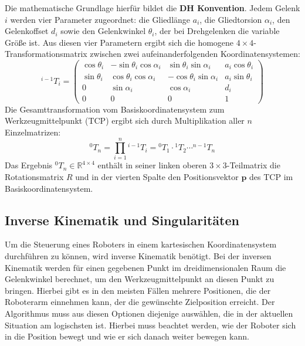         Die mathematische Grundlage hierfür bildet die \textbf{\ac{DH}\- Konvention}.
        Jedem Gelenk $i$ werden vier Parameter zugeordnet:
        die Gliedlänge $a_i$, die Gliedtorsion $\alpha_i$, den Gelenkoffset $d_i$ sowie den Gelenkwinkel $\theta_i$,
        der bei Drehgelenken die variable Größe ist.
        Aus diesen vier Parametern ergibt sich die homogene $4 \times 4$-Transformationsmatrix zwischen zwei aufeinanderfolgenden Koordinatensystemen:
        \begin{equation}
            ^{i-1}T_i =
            \begin{pmatrix}
                \cos\theta_i & -\sin\theta_i\cos\alpha_i &  \sin\theta_i\sin\alpha_i & a_i\cos\theta_i \\
                \sin\theta_i &  \cos\theta_i\cos\alpha_i & -\cos\theta_i\sin\alpha_i & a_i\sin\theta_i \\
                0            &  \sin\alpha_i             &  \cos\alpha_i             & d_i             \\
                0            &  0                        &  0                        & 1
            \end{pmatrix}
            \label{eq:dh-matrix}
        \end{equation}
        Die Gesamttransformation vom Basiskoordinatensystem zum Werkzeugmittelpunkt (\ac{TCP}) ergibt sich
        durch Multiplikation aller $n$ Einzelmatrizen:
        \begin{equation}
            ^0T_n = \prod_{i=1}^{n} {}^{i-1}T_i = {}^0T_1 \cdot {}^1T_2 \cdots {}^{n-1}T_n
            \label{eq:forward-kinematics}
        \end{equation}
        Das Ergebnis $^0T_n \in \mathbb{R}^{4 \times 4}$ enthält in seiner linken oberen $3 \times 3$-Teilmatrix die Rotationsmatrix $R$
        und in der vierten Spalte den Positionsvektor $\mathbf{p}$ des \ac{TCP} im Basiskoordinatensystem.
        \cite{craigIntroductionRoboticsMechanics2005}

        \subsection{Inverse Kinematik und Singularitäten}\label{subsec:inverse-kinematics-and-singularities}
        Um die Steuerung eines Roboters in einem kartesischen Koordinatensystem durchführen zu können, wird inverse Kinematik benötigt.
        Bei der inversen Kinematik werden für einen gegebenen Punkt im dreidimensionalen Raum die Gelenkwinkel berechnet, um den Werkzeugmittelpunkt an diesen Punkt zu bringen.
        Hierbei gibt es in den meisten Fällen mehrere Positionen, die der Roboterarm einnehmen kann, der die gewünschte Zielposition erreicht.
        Der Algorithmus muss aus diesen Optionen diejenige auswählen, die in der aktuellen Situation am logischsten ist.
        Hierbei muss beachtet werden, wie der Roboter sich in die Position bewegt und wie er sich danach weiter bewegen kann.

